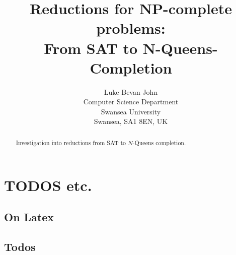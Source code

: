 \documentclass[a4paper]{report}
\begin{document}
\title{Reductions for NP-complete problems:\\ From SAT to N-Queens-Completion}

\author{Luke Bevan John\\
  Computer Science Department\\
  Swansea University\\
  Swansea, SA1 8EN, UK
}
\date{}

\maketitle

\begin{abstract}
  Investigation into reductions from SAT to $N$-Queens completion.
\end{abstract}

\tableofcontents


\setcounter{chapter}{-1}

\chapter{TODOS etc.}
\label{cha:todos}

\section{On Latex}
\label{sec:todoslatex}

\cite{lamport94}


\section{Todos}
\label{sec:todostodos}
\end{document}

